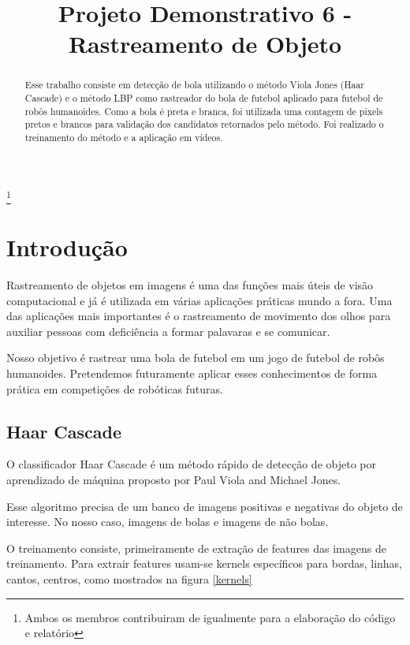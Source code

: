 \documentclass{bmvc2k}
\title{Projeto Demonstrativo 6 - Rastreamento de Objeto}
\begin{document}
\maketitle

\footnote[0]{Ambos os membros contribuiram de igualmente para a elaboração do código e relatório}

\begin{abstract}

Esse trabalho consiste em detecção de bola utilizando o método Viola Jones (Haar Cascade) e o método LBP como rastreador do bola de futebol aplicado para futebol de robôs humanoides. Como a bola é preta e branca, foi utilizada uma contagem de pixels pretos e brancos para validação dos candidatos retornados pelo método. Foi realizado o treinamento do método e a aplicação em vídeos.

\end{abstract}

\section{Introdução}
\label{sec:intro}

Rastreamento de objetos em imagens é uma das funções mais úteis de visão computacional e já é utilizada em várias aplicações práticas mundo a fora. Uma das aplicações mais importantes é o rastreamento de movimento dos olhos para auxiliar pessoas com deficiência a formar palavaras e se comunicar.


Nosso objetivo é rastrear uma bola de futebol em um jogo de futebol de robôs humanoides. Pretendemos futuramente aplicar esses conhecimentos de forma prática em competições de robóticas futuras.

    
\subsection{Haar Cascade}

O classificador Haar Cascade \cite{haar} é um método rápido de detecção de objeto por aprendizado de máquina proposto por Paul Viola and Michael Jones.

Esse algoritmo precisa de um banco de imagens positivas e negativas do objeto de interesse. No nosso caso, imagens de bolas e imagens de não bolas. 

O treinamento consiste, primeiramente de extração de features das imagens de treinamento. Para extrair features usam-se kernels específicos para bordas, linhas, cantos, centros, como mostrados na figura \ref{kernels}
\end{document}
